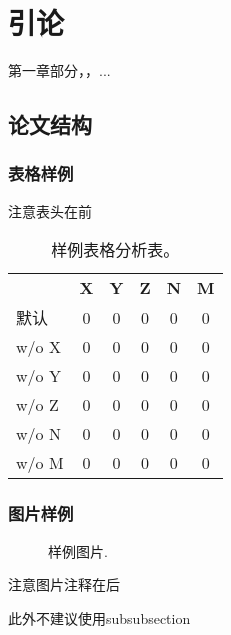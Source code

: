 \chapter{引论}
\label{chap:introduction}

第一章\cite{china2016thirteenfive,yang2019xlnet}部分\cite{devlin2018bert}，\citeauthor{gut2013probability}，...

\section{论文结构}


\subsection{表格样例}

注意表头在前

\begin{table*}[htbp]
\vskip 0.1in
\begin{center}
\caption{样例表格分析表。}
\label{tab:example-table}
\begin{small}
\begin{tabular}{@{}lccccc@{}}
 & \textbf{X} & \textbf{Y} & \textbf{Z} & \textbf{N} & \textbf{M} \\
    默认        & 0 & 0 & 0 & 0 & 0 \\
  \quad w/o X   & 0 & 0 & 0 & 0 & 0 \\
  \quad w/o Y   & 0 & 0 & 0 & 0 & 0 \\
  \quad w/o Z   & 0 & 0 & 0 & 0 & 0 \\
  \quad w/o N   & 0 & 0 & 0 & 0 & 0 \\
  \quad w/o M   & 0 & 0 & 0 & 0 & 0 \\
\end{tabular}
\end{small}
\end{center}
\vskip -0.1in
\end{table*}


\subsection{图片样例}

\begin{figure}[htb]
    \begin{center}
    \caption{样例图片.}
    \label{fig:example_img}
    \end{center}
\end{figure}

注意图片注释在后

此外不建议使用subsubsection


